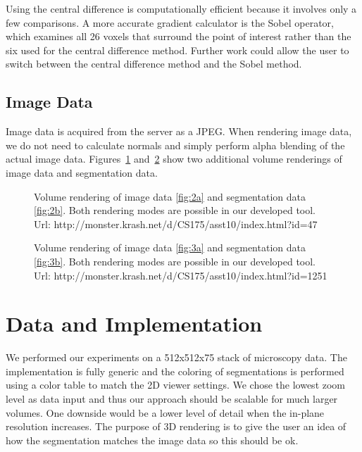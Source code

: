 \documentclass[annual]{acmsiggraph}
\begin{document}
Using the central difference is computationally efficient because it involves only a few comparisons. A more accurate gradient calculator is the Sobel operator, which examines all 26 voxels that surround the point of interest rather than the six used for the central difference method. Further work could allow the user to switch between the central difference method and the Sobel method.


\subsection{Image Data}
Image data is acquired from the server as a JPEG. When rendering image data, we do not need to calculate normals and simply perform alpha blending of the actual image data. Figures~\ref{fig:compare1} and~\ref{fig:compare2} show two additional volume renderings of image data and segmentation data.

\begin{figure}[h]
\centering     %
{}
\caption{Volume rendering of image data \ref{fig:2a} and segmentation data \ref{fig:2b}. Both rendering modes are possible in our developed tool. \\Url: http://monster.krash.net/d/CS175/asst10/index.html?id=47}
\label{fig:compare1}
\end{figure}

\begin{figure}[h]
\centering     %
{}
\caption{Volume rendering of image data \ref{fig:3a} and segmentation data \ref{fig:3b}. Both rendering modes are possible in our developed tool. \\Url: http://monster.krash.net/d/CS175/asst10/index.html?id=1251}
\label{fig:compare2}
\end{figure}

\section{Data and Implementation}
We performed our experiments on a 512x512x75 stack of microscopy data. The implementation is fully generic and the coloring of segmentations is performed using a color table to match the 2D viewer settings. We chose the lowest zoom level as data input and thus our approach should be scalable for much larger volumes. One downside would be a lower level of detail when the in-plane resolution increases. The purpose of 3D rendering is to give the user an idea of how the segmentation matches the image data so this should be ok.
\end{document}
